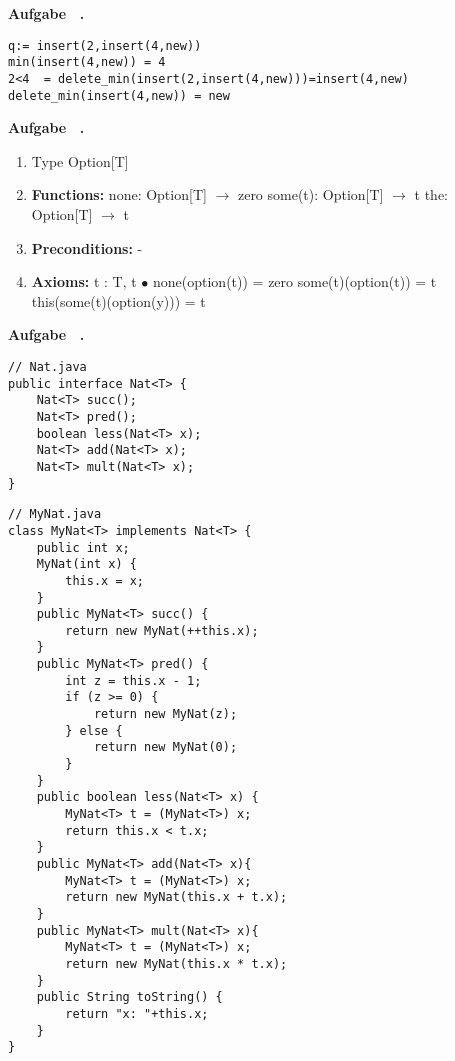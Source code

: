 \documentclass[a4paper,11pt]{article}             %
\def\vblatt{~}
\newcommand{\lstalg}{\lstset { numbers=left,language=alglang,tabsize=2,numberstyle=\tiny,style=algstyle}}
\newcounter{aufgabe}
\newcommand{\Aufgabe}{\noindent\newline\addtocounter{aufgabe}{1}\textbf{Aufgabe \vblatt.\theaufgabe}\\
}
\begin{document}
\Aufgabe
\lstalg
\begin{lstlisting}
q:= insert(2,insert(4,new))
min(insert(4,new)) = 4
2<4  = delete_min(insert(2,insert(4,new)))=insert(4,new)
delete_min(insert(4,new)) = new
\end{lstlisting}

\Aufgabe
\begin{enumerate}
\item Type Option[T]
\item \textbf{Functions:} 
\subitem none: Option[T] $\rightarrow$ zero
\subitem some(t): Option[T] $\rightarrow$ t
\subitem the: Option[T] $\rightarrow$ t 

\item \textbf{Preconditions:} -

\item \textbf{Axioms:} 
\subitem t : T, t $\bullet$
\subitem none(option(t)) = zero
\subitem some(t)(option(t)) = t
\subitem this(some(t)(option(y))) = t
\end{enumerate}

\Aufgabe
\begin{lstlisting}[style=javastyle]
// Nat.java 
public interface Nat<T> {
    Nat<T> succ();
    Nat<T> pred();
    boolean less(Nat<T> x);
    Nat<T> add(Nat<T> x);
    Nat<T> mult(Nat<T> x);
}
\end{lstlisting}

\newpage
\begin{lstlisting}[style=javastyle]
// MyNat.java 
class MyNat<T> implements Nat<T> {
    public int x;
    MyNat(int x) {
        this.x = x;
    }
    public MyNat<T> succ() {
        return new MyNat(++this.x);
    }
    public MyNat<T> pred() {
        int z = this.x - 1;
        if (z >= 0) {
            return new MyNat(z);
        } else {
            return new MyNat(0);
        }
    }
    public boolean less(Nat<T> x) {
        MyNat<T> t = (MyNat<T>) x;
        return this.x < t.x;
    }
    public MyNat<T> add(Nat<T> x){
        MyNat<T> t = (MyNat<T>) x;
        return new MyNat(this.x + t.x);
    }
    public MyNat<T> mult(Nat<T> x){
        MyNat<T> t = (MyNat<T>) x;
        return new MyNat(this.x * t.x);
    }
    public String toString() {
        return "x: "+this.x;
    }
}
\end{lstlisting}
\end{document}
